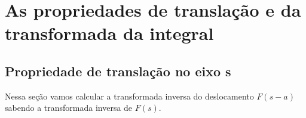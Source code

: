 \chapter{As propriedades de translação e da transformada da integral}
\section{Propriedade de translação no eixo s}
Nessa seção vamos calcular a transformada inversa do deslocamento $F(s-a)$ sabendo a transformada inversa de $F(s)$. %

